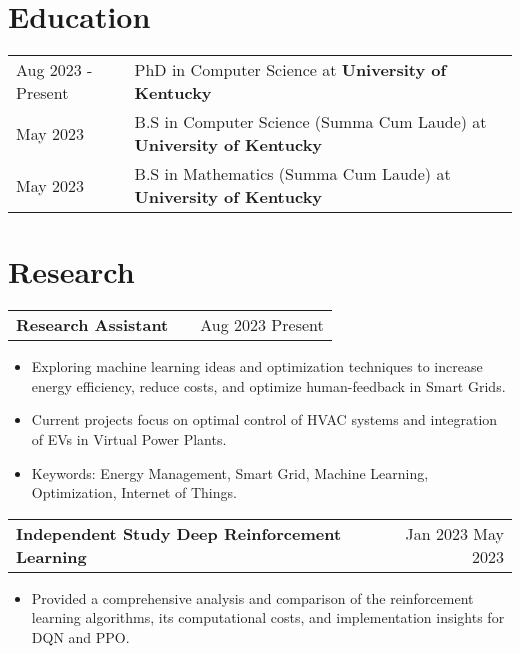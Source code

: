 \documentclass[a4paper,12pt]{article}
\makeatletter
\newenvironment{joblong}[2]
    {
    \begin{tabularx}{\linewidth}{@{}l X r@{}}
    \textbf{#1} & \hfill &  #2 \\[3.75pt]
    \end{tabularx}
    \begin{minipage}[t]{\linewidth}
    \begin{itemize}[nosep,after=\strut, leftmargin=1em, itemsep=3pt,label=--]
    }
    {
    \end{itemize}
    \end{minipage}    
    }
\makeatother
\begin{document}
\section{Education}
\begin{tabularx}{\linewidth}{@{}l X@{}}	
Aug 2023 - Present & PhD in Computer Science at \textbf{University of Kentucky} \\ %
May 2023 & B.S in Computer Science (Summa Cum Laude) at \textbf{University of Kentucky} \\ %
May 2023 & B.S in Mathematics (Summa Cum Laude) at \textbf{University of Kentucky} \\ %
\end{tabularx}


\section{Research}

\begin{joblong}{Research Assistant}{Aug 2023 Present} %
\item Exploring machine learning ideas and optimization techniques to increase energy efficiency, reduce costs, and optimize human-feedback in Smart Grids. %
\item Current projects focus on optimal control of HVAC systems and integration of EVs in Virtual Power Plants. %
\item Keywords: Energy Management, Smart Grid, Machine Learning, Optimization, Internet of Things. %
\end{joblong}

\begin{joblong}{Independent Study Deep Reinforcement Learning}{Jan 2023 May 2023} %
\item Provided a comprehensive analysis and comparison of the reinforcement learning algorithms, its computational costs, and implementation insights for DQN and PPO. %
\end{joblong}
\end{document}
